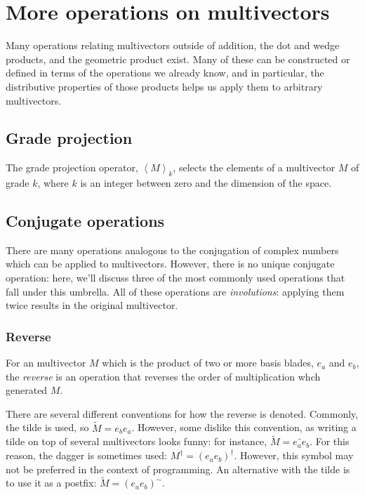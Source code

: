 \section{More operations on multivectors}

Many operations relating multivectors outside of addition, the dot and wedge products, and the
geometric product exist. Many of these can be constructed or defined in terms of the operations we
already know, and in particular, the distributive properties of those products helps us apply them
to arbitrary multivectors.

\subsection{Grade projection}

The grade projection operator, $\left<M\right>_k$, selects the elements of a multivector $M$ of
grade $k$, where $k$ is an integer between zero and the dimension of the space.

\subsection{Conjugate operations}

There are many operations analogous to the conjugation of complex numbers which can be applied to
multivectors. However, there is no unique conjugate operation: here, we'll discuss three of the most
commonly used operations that fall under this umbrella. All of these operations are
\textit{involutions}: applying them twice results in the original multivector.

\subsubsection{Reverse}

For an multivector $M$ which is the product of two or more basis blades, $e_a$ and $e_b$, the
\textit{reverse} is an operation that reverses the order of multiplication whch generated $M$.

There are several different conventions for how the reverse is denoted. Commonly, the tilde is used,
so $\tilde{M} = e_b e_a$. However, some dislike this convention, as writing a tilde on top of
several multivectors looks funny: for instance, $\tilde{M} = \widetilde{e_a e_b}$. For this reason,
the dagger is sometimes used: $M^\dagger = \left(e_a e_b\right)^\dagger$. However, this symbol may
not be preferred in the context of programming. An alternative with the tilde is to use it as a
postfix: $\tilde{M} = \left(e_a e_b\right)^\sim$.

